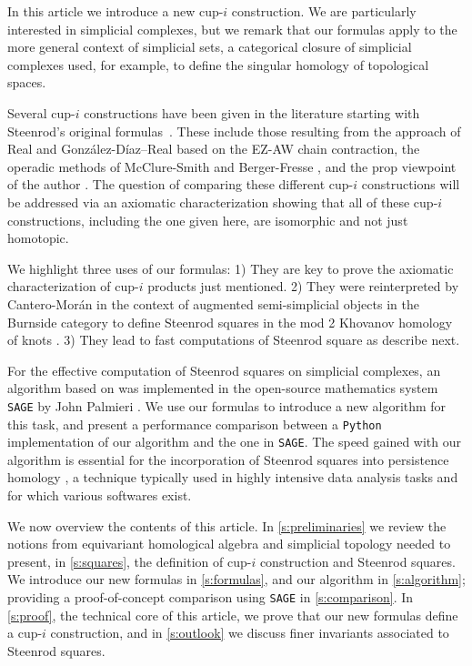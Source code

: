 In this article we introduce a new cup-$i$ construction.
We are particularly interested in simplicial complexes, but we remark that our formulas apply to the more general context of simplicial sets, a categorical closure of simplicial complexes used, for example, to define the singular homology of topological spaces.

Several cup-$i$ constructions have been given in the literature starting with Steenrod's original formulas~\cite{steenrod47}.
These include those resulting from the approach of Real \cite{real1996computability} and Gonz\'alez-D\'iaz--Real \cite{gonzalez1999combinatorial, gonzalez2003computation, gonzalez2005hpt} based on the EZ-AW chain contraction, the operadic methods of McClure-Smith \cite{mcclure03cochain} and Berger-Fresse \cite{berger04combinatorial}, and the prop viewpoint of the author \cite{medina2020prop1, medina2018prop2}.
The question of comparing these different cup-$i$ constructions will be addressed via an axiomatic characterization \cite{medina2018axiomatic} showing that all of these cup-$i$ constructions, including the one given here, are isomorphic and not just homotopic.

We highlight three uses of our formulas:
1) They are key to prove the axiomatic characterization of cup-$i$ products just mentioned.
2) They were reinterpreted by Cantero-Mor\'an \cite{cantero2020khovanov} in the context of augmented semi-simplicial objects in the Burnside category to define Steenrod squares in the mod 2 Khovanov homology of knots \cite{khovanov2000categorification}.
3) They lead to fast computations of Steenrod square as describe next.

For the effective computation of Steenrod squares on simplicial complexes, an algorithm based on \cite{gonzalez1999combinatorial} was implemented in the open-source mathematics system \verb|SAGE| by John Palmieri \cite{sagemath}.
We use our formulas to introduce a new algorithm for this task, and present a performance comparison between a \verb|Python| implementation of our algorithm and the one in \verb|SAGE|.
The speed gained with our algorithm is essential for the incorporation of Steenrod squares into persistence homology \cite{medina2018persistence}, a technique typically used in highly intensive data analysis tasks \cite{carlsson2008images, carlsson2013viral, lee2018nanoporous} and for which various softwares \cite{bauer2019ripser, gudhi, medina2020giottotda} exist.

We now overview the contents of this article.
In \cref{s:preliminaries} we review the notions from equivariant homological algebra and simplicial topology needed to present, in \cref{s:squares}, the definition of cup-$i$ construction and Steenrod squares.
We introduce our new formulas in \cref{s:formulas}, and our algorithm in \cref{s:algorithm}; providing a proof-of-concept comparison using \verb|SAGE| in \cref{s:comparison}.
In \cref{s:proof}, the technical core of this article, we prove that our new formulas define a cup-$i$ construction, and in \cref{s:outlook} we discuss finer invariants associated to Steenrod squares.